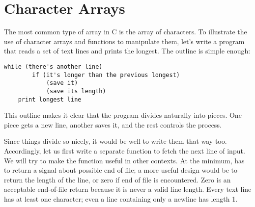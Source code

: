 \section{Character Arrays}


The most common type of array in C is the array of characters.
To illustrate the use of character arrays and functions to manipulate them, let's write a program that reads a set of text lines and prints the longest.
The outline is simple enough:
\begin{lstlisting}[basicstyle=\ttfamily\normalsize\itshape, keywordstyle=\color{black}, stringstyle=\color{black}]
	while (there's another line)
		if (it's longer than the previous longest)
			(save it)
			(save its length)
	print longest line
\end{lstlisting}
This outline makes it clear that the program divides naturally into pieces.
One piece gets a new line, another saves it, and the rest controls the process.

Since things divide so nicely, it would be well to write them that way too.
Accordingly, let us first write a separate function  to fetch the next line of input.
We will try to make the function useful in other contexts.
At the minimum,  has to return a signal about possible end of file; a more useful design would be to return the length of the line, or zero if end of file is encountered.
Zero is an acceptable end-of-file return because it is never a valid line length.
Every text line has at least one character; even a line containing only a newline has length 1.


